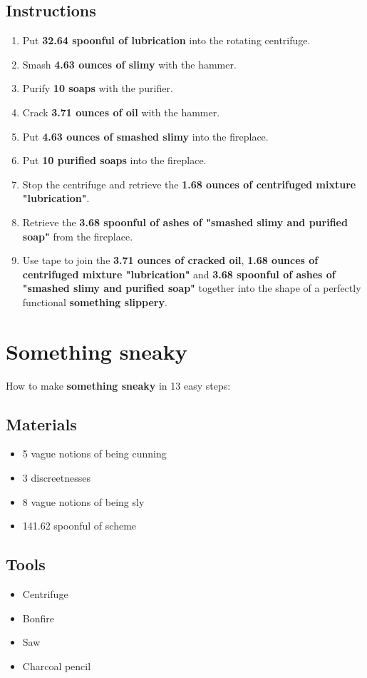 \documentclass{article}
\begin{document}
\subsection{Instructions}\begin{enumerate}
\item 
Put \textbf{32.64 spoonful of lubrication} into the rotating centrifuge.
\item 
Smash \textbf{4.63 ounces of slimy} with the hammer.
\item 
Purify \textbf{10 soaps} with the purifier.
\item 
Crack \textbf{3.71 ounces of oil} with the hammer.
\item 
Put \textbf{4.63 ounces of smashed slimy} into the fireplace.
\item 
Put \textbf{10 purified soaps} into the fireplace.
\item 
Stop the centrifuge and retrieve the \textbf{1.68 ounces of centrifuged mixture "lubrication"}.
\item 
Retrieve the \textbf{3.68 spoonful of ashes of "smashed slimy and purified soap"} from the fireplace.
\item 
Use tape to join the \textbf{3.71 ounces of cracked oil}, \textbf{1.68 ounces of centrifuged mixture "lubrication"} and \textbf{3.68 spoonful of ashes of "smashed slimy and purified soap"} together into the shape of a perfectly functional \textbf{something slippery}.
\end{enumerate}
\newpage
\section{Something sneaky}How to make \textbf{something sneaky} in 13 easy steps:

\subsection{Materials}\begin{itemize}
\item 
5 vague notions of being cunning
\item 
3 discreetnesses
\item 
8 vague notions of being sly
\item 
141.62 spoonful of scheme
\end{itemize}
\subsection{Tools}\begin{itemize}
\item 
Centrifuge
\item 
Bonfire
\item 
Saw
\item 
Charcoal pencil
\end{itemize}
\end{document}
